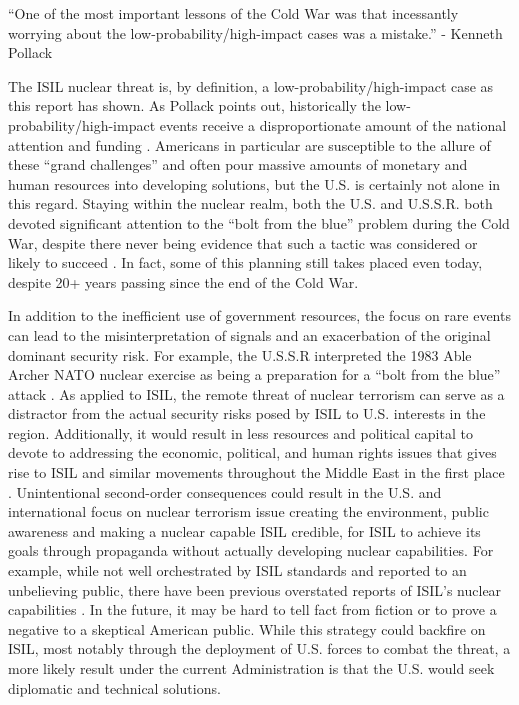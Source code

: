\documentclass{report}
\begin{document}
\begin{center}
 \enquote{One of the most important lessons of the Cold War was that incessantly worrying about the low-probability/high-impact cases was a mistake.}  - Kenneth Pollack \cite{pollack2014unthinkable}
\end{center}


The ISIL nuclear threat is, by definition, a low-probability/high-impact case as this report has shown. As Pollack points out, historically the low-probability/high-impact events receive a disproportionate amount of the national attention and funding \cite{pollack2014unthinkable}. Americans in particular are susceptible to the allure of these \enquote{grand challenges} and often pour massive amounts of monetary and human resources into developing solutions, but the U.S. is certainly not alone in this regard. Staying within the nuclear realm, both the U.S. and U.S.S.R. both devoted significant attention to the \enquote{bolt from the blue} problem during the Cold War, despite there never being evidence that such a tactic was considered or likely to succeed \cite{pollack2014unthinkable,Bracken2013}.  In fact, some of this planning still takes placed even today, despite 20+ years passing since the end of the Cold War.

In addition to the inefficient use of government resources, the focus on rare events can lead to the misinterpretation of signals and an exacerbation of the original dominant security risk.  For example, the U.S.S.R interpreted the 1983 Able Archer NATO nuclear exercise as being a preparation for a \enquote{bolt from the blue} attack \cite{pollack2014unthinkable}. As applied to ISIL, the remote threat of nuclear terrorism can serve as a distractor from the actual security risks posed by ISIL to U.S. interests in the region.  Additionally, it would result in less resources and political capital to devote to addressing the economic, political, and human rights issues that gives rise to ISIL and similar movements throughout the Middle East in the first place \cite{Morand2015}. Unintentional second-order consequences could result in the U.S. and international focus on nuclear terrorism issue creating the environment, public awareness and making a nuclear capable ISIL credible, for ISIL to achieve its goals through propaganda without actually developing nuclear capabilities.  For example, while not well orchestrated by ISIL standards and reported to an unbelieving public, there have been previous overstated reports of ISIL's nuclear capabilities \cite{Bunn2014}.  In the future, it may be hard to tell fact from fiction or to prove a negative to a skeptical American public.  While this strategy could backfire on ISIL, most notably through the deployment of U.S. forces to combat the threat, a more likely result under the current Administration is that the U.S. would seek diplomatic and technical solutions.  
\end{document}
